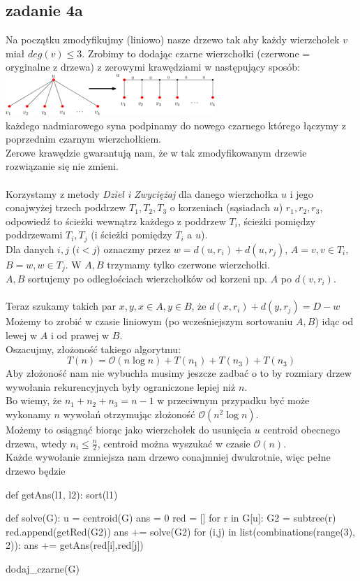 \documentclass{article}
\begin{document}
\subsection*{zadanie 4a}
Na początku zmodyfikujmy (liniowo) nasze drzewo tak aby każdy wierzchołek $v$ miał $deg(v) \leq 3$. Zrobimy to dodając czarne wierzchołki (czerwone = oryginalne z drzewa) z zerowymi krawędziami w następujący sposób:\\
\includegraphics[scale=1.2]{czarne}\\
każdego nadmiarowego syna podpinamy do nowego czarnego którego łączymy z poprzednim czarnym wierzchołkiem.\\
Zerowe krawędzie gwarantują nam, że w tak zmodyfikowanym drzewie rozwiązanie się nie zmieni.\\\\
Korzystamy z metody \textit{Dziel i Zwyciężaj} dla danego wierzchołka $u$ i jego conajwyżej trzech poddrzew $T_1,T_2,T_3$ o korzeniach (sąsiadach $u$) $r_1,r_2,r_3$, odpowiedź to ścieżki wewnątrz każdego z poddrzew $T_i$, ścieżki pomiędzy poddrzewami $T_i, T_j$ (i ścieżki pomiędzy $T_i$ a $u$).\\
Dla danych $i,j$ ($i<j$) oznaczmy przez $w = d(u,r_i) + d(u,r_j)$, $A = v, v \in {T_i}$, $B = w, w \in T_j$. W $A,B$ trzymamy tylko czerwone wierzchołki.\\$A,B$ sortujemy po odległościach wierzchołków od korzeni np. $A$ po $d(v,r_i)$.\\\\
Teraz szukamy takich par $x,y, x\in A, y \in B$, że $d(x,r_i) + d(y,r_j) = D - w$\\
Możemy to zrobić w czasie liniowym (po wcześniejszym sortowaniu $A,B$) idąc od lewej w $A$ i od prawej w $B$.\\
Oszacujmy, złożoność takiego algorytmu:
$$
T(n) = \mathcal{O}(n\log{n}) + T(n_1) + T(n_3) + T(n_3)
$$
Aby złożoność nam nie wybuchła musimy jeszcze zadbać o to by rozmiary drzew wywołania rekurencyjnych były ograniczone lepiej niż $n$. \\Bo wiemy, że $n_1 + n_2 + n_3 = n-1$ w przeciwnym przypadku być może wykonamy $n$ wywołań otrzymując złożoność $\mathcal{O}(n^2\log{n})$.\\
Możemy to osiągnąć biorąc jako wierzchołek do usunięcia $u$ centroid obecnego drzewa, wtedy $n_i \leq \frac{n}{2}$, centroid można wyszukać w czasie $\mathcal{O}(n)$.\\
Każde wywołanie zmniejsza nam drzewo conajmniej dwukrotnie, więc pełne drzewo będzie \\
\clearpage
\begin{python}
def getAns(l1, l2):
    sort(l1)

def solve(G):
    u = centroid(G)
    ans = 0
    red = []
    for r in G[u]:
        G2 = subtree(r)
        red.append(getRed(G2))
        ans += solve(G2)
    for (i,j) in list(combinations(range(3), 2)):
        ans += getAns(red[i],red[j])

dodaj_czarne(G)
\end{python}
\end{document}
